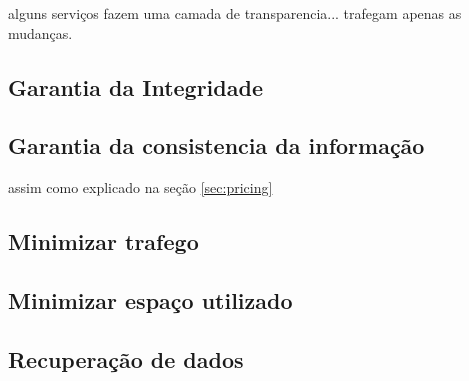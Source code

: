 	alguns serviços fazem uma camada de transparencia...
	trafegam apenas as mudanças.

	

	\subsection{Garantia da Integridade}%



	\subsection{Garantia da consistencia da informação}%

	assim como explicado na seção \ref{sec:pricing}


	\subsection{Minimizar trafego}

	

	\subsection{Minimizar espaço utilizado}

	

	\subsection{Recuperação de dados}%

	
